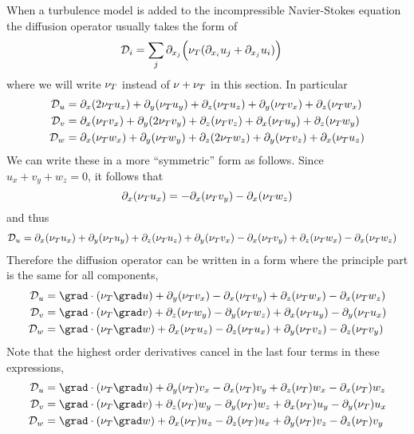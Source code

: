 When a turbulence model is added to the incompressible Navier-Stokes equation the diffusion
operator usually takes the form of 
\begin{align*}
   {\cal D}_i &= \sum_j \partial_{x_j} \Big( \nu_T (\partial_{x_i} u_j + \partial_{x_j} u_i) \Big) 
\end{align*}
where we will write  $\nu_T$ instead of $\nu+\nu_T$ in this section.
In particular
\begin{align*}
   {\cal D}_u &= \partial_x( 2\nu_T u_x) + \partial_y( \nu_T u_y) + \partial_z( \nu_T u_z ) 
                    + \partial_y( \nu_T v_x ) + \partial_z( \nu_T w_x ) \\
   {\cal D}_v &= \partial_x( \nu_T v_x) + \partial_y(2\nu_T v_y) + \partial_z( \nu_T v_z ) 
                    + \partial_x( \nu_T u_y ) + \partial_z( \nu_T w_y ) \\
   {\cal D}_w &= \partial_x( \nu_T w_x) + \partial_y( \nu_T w_y) + \partial_z(2\nu_T w_z ) 
                    + \partial_y( \nu_T v_z ) + \partial_x( \nu_T u_z ) \\
\end{align*}
We can write these in a more ``symmetric'' form as follows.
Since $u_x+v_y+w_z=0$, it follows that 
\[
   \partial_x( \nu_T u_x) = -\partial_x( \nu_T v_y ) -\partial_x( \nu_T w_z ) 
\]
and thus 
\begin{align*}
 {\cal D}_u &= \partial_x ( \nu_T u_x) + \partial_y( \nu_T u_y) + \partial_z( \nu_T u_z ) 
               + \partial_y( \nu_T v_x ) -\partial_x( \nu_T v_y ) + \partial_z( \nu_T w_x )-\partial_x( \nu_T w_z )
\end{align*}
Therefore the diffusion operator can be written in a form where the principle part is the 
same for all components,
\begin{align*}
 \Dopu &= \grad\cdot( \nuT \grad u) + \partial_y( \nuT v_x ) -\partial_x( \nuT v_y ) 
                                         + \partial_z( \nuT w_x ) -\partial_x( \nuT w_z ) \\
 \Dopv &= \grad\cdot( \nuT \grad v) + \partial_z( \nuT w_y ) -\partial_y( \nuT w_z ) 
                                         + \partial_x( \nuT u_y ) -\partial_y( \nuT u_x ) \\
 \Dopw &= \grad\cdot( \nuT \grad w) + \partial_x( \nuT u_z ) -\partial_z( \nuT u_x ) 
                                         + \partial_y( \nuT v_z ) -\partial_z( \nuT v_y ) 
\end{align*}
Note that the highest order derivatives cancel in the last four terms in these expressions,\begin{align*}
 \Dopu &= \grad\cdot( \nuT \grad u) + \partial_y( \nuT) v_x -\partial_x(\nuT) v_y  
                                         + \partial_z( \nuT) w_x -\partial_x(\nuT) w_z  \\
 \Dopv &= \grad\cdot( \nuT \grad v) + \partial_z( \nuT) w_y -\partial_y(\nuT) w_z  
                                         + \partial_x( \nuT) u_y -\partial_y(\nuT) u_x  \\
 \Dopw &= \grad\cdot( \nuT \grad w) + \partial_x( \nuT) u_z -\partial_z(\nuT) u_x  
                                         + \partial_y( \nuT) v_z -\partial_z(\nuT) v_y  
\end{align*}

